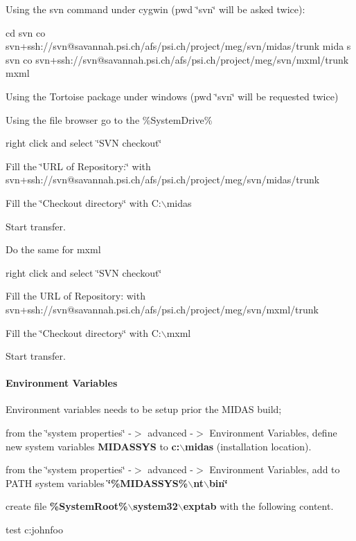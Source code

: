 \begin{DoxyItemize}
\item Using the svn command under cygwin (pwd \char`\"{}svn\char`\"{} will be asked twice): 
\begin{DoxyCode}
 cd %
 svn co svn+ssh://svn@savannah.psi.ch/afs/psi.ch/project/meg/svn/midas/trunk mida
      s
 svn co svn+ssh://svn@savannah.psi.ch/afs/psi.ch/project/meg/svn/mxml/trunk mxml
\end{DoxyCode}

\end{DoxyItemize}


\begin{DoxyItemize}
\item Using the Tortoise package under windows (pwd \char`\"{}svn\char`\"{} will be requested twice)
\begin{DoxyItemize}
\item Using the file browser go to the \%SystemDrive\%
\item right click and select \char`\"{}SVN checkout\char`\"{}
\item Fill the \char`\"{}URL of Repository:\char`\"{} with svn+ssh://svn@savannah.psi.ch/afs/psi.ch/project/meg/svn/midas/trunk
\item Fill the \char`\"{}Checkout directory\char`\"{} with C:$\backslash$midas
\item Start transfer.
\item Do the same for mxml
\item right click and select \char`\"{}SVN checkout\char`\"{}
\item Fill the URL of Repository: with svn+ssh://svn@savannah.psi.ch/afs/psi.ch/project/meg/svn/mxml/trunk
\item Fill the \char`\"{}Checkout directory\char`\"{} with C:$\backslash$mxml
\item Start transfer.
\end{DoxyItemize}
\end{DoxyItemize}\hypertarget{Q_Windows_Q_Windows_Environment_Variables}{}\paragraph{Environment Variables}\label{Q_Windows_Q_Windows_Environment_Variables}
Environment variables needs to be setup prior the MIDAS build;
\begin{DoxyItemize}
\item from the \char`\"{}system properties\char`\"{} -\/$>$ advanced -\/$>$ Environment Variables, define new system variables {\bfseries MIDASSYS} to {\bfseries c:$\backslash$midas} (installation location).
\item from the \char`\"{}system properties\char`\"{} -\/$>$ advanced -\/$>$ Environment Variables, add to PATH system variables {\bfseries \char`\"{}\%MIDASSYS\%$\backslash$nt$\backslash$bin\char`\"{}} 
\item create file {\bfseries \%SystemRoot\%$\backslash$system32$\backslash$exptab} with the following content. 
\begin{DoxyCode}
  test c:\online johnfoo 
\end{DoxyCode}

\end{DoxyItemize}


